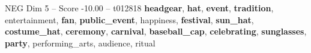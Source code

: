 \begin{textsample}{NEG Dim 5 – Score -10.00 – t012818}  \label{ex:f5_neg_004}
\textbf{headgear}, \textbf{hat}, \textbf{event}, \textbf{tradition}, entertainment, \textbf{fan}, \textbf{public\_event}, happiness, \textbf{festival}, \textbf{sun\_hat}, \textbf{costume\_hat}, \textbf{ceremony}, \textbf{carnival}, \textbf{baseball\_cap}, \textbf{celebrating}, \textbf{sunglasses}, \textbf{party}, performing\_arts, audience, ritual

\end{textsample}
